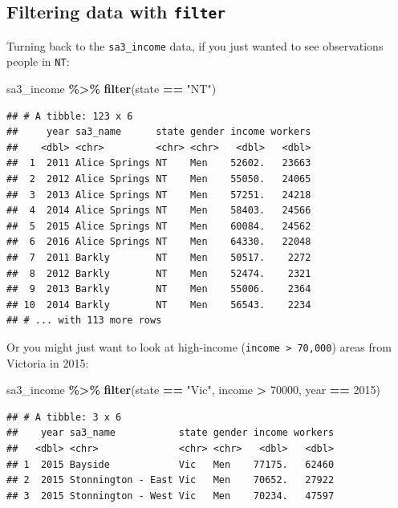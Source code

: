 \documentclass[
]{book}
\newenvironment{Shaded}{\begin{snugshade}}{\end{snugshade}}
\newcommand{\DecValTok}[1]{\textcolor[rgb]{0.00,0.00,0.81}{#1}}
\newcommand{\KeywordTok}[1]{\textcolor[rgb]{0.13,0.29,0.53}{\textbf{#1}}}
\newcommand{\NormalTok}[1]{#1}
\newcommand{\OperatorTok}[1]{\textcolor[rgb]{0.81,0.36,0.00}{\textbf{#1}}}
\newcommand{\StringTok}[1]{\textcolor[rgb]{0.31,0.60,0.02}{#1}}
\begin{document}
\hypertarget{filtering-data-with-filter}{%
\subsection{\texorpdfstring{Filtering data with \texttt{filter}}{Filtering data with filter}}\label{filtering-data-with-filter}}

Turning back to the \texttt{sa3\_income} data, if you just wanted to see observations people in \texttt{NT}:

\begin{Shaded}
\begin{Highlighting}[]
\NormalTok{sa3\_income }\OperatorTok{\%\textgreater{}\%}\StringTok{ }
\StringTok{  }\KeywordTok{filter}\NormalTok{(state }\OperatorTok{==}\StringTok{ "NT"}\NormalTok{)}
\end{Highlighting}
\end{Shaded}

\begin{verbatim}
## # A tibble: 123 x 6
##     year sa3_name      state gender income workers
##    <dbl> <chr>         <chr> <chr>   <dbl>   <dbl>
##  1  2011 Alice Springs NT    Men    52602.   23663
##  2  2012 Alice Springs NT    Men    55050.   24065
##  3  2013 Alice Springs NT    Men    57251.   24218
##  4  2014 Alice Springs NT    Men    58403.   24566
##  5  2015 Alice Springs NT    Men    60084.   24562
##  6  2016 Alice Springs NT    Men    64330.   22048
##  7  2011 Barkly        NT    Men    50517.    2272
##  8  2012 Barkly        NT    Men    52474.    2321
##  9  2013 Barkly        NT    Men    55006.    2364
## 10  2014 Barkly        NT    Men    56543.    2234
## # ... with 113 more rows
\end{verbatim}

Or you might just want to look at high-income (\texttt{income\ \textgreater{}\ 70,000}) areas from Victoria in 2015:

\begin{Shaded}
\begin{Highlighting}[]
\NormalTok{sa3\_income }\OperatorTok{\%\textgreater{}\%}\StringTok{ }
\StringTok{  }\KeywordTok{filter}\NormalTok{(state }\OperatorTok{==}\StringTok{ "Vic"}\NormalTok{,}
\NormalTok{         income }\OperatorTok{\textgreater{}}\StringTok{ }\DecValTok{70000}\NormalTok{,}
\NormalTok{         year }\OperatorTok{==}\StringTok{ }\DecValTok{2015}\NormalTok{)}
\end{Highlighting}
\end{Shaded}

\begin{verbatim}
## # A tibble: 3 x 6
##    year sa3_name           state gender income workers
##   <dbl> <chr>              <chr> <chr>   <dbl>   <dbl>
## 1  2015 Bayside            Vic   Men    77175.   62460
## 2  2015 Stonnington - East Vic   Men    70652.   27922
## 3  2015 Stonnington - West Vic   Men    70234.   47597
\end{verbatim}
\end{document}
